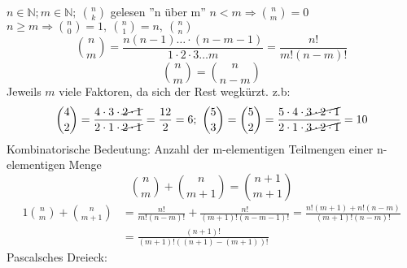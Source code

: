 $n \in \mathbb{N}; m \in \mathbb{N};\ \binom{n}{k}$  gelesen ''n über m'' $n < m \Rightarrow \binom{n}{m} = 0$ $n \geq m \Rightarrow \binom{n}{0} = 1,\ \binom{n}{1} = n,\ \binom{n}{n}$
$$\binom{n}{m} = \frac{n(n-1) \dots \cdot (n-m-1)}{1\cdot 2\cdot3 \dots m} = \frac{n!}{m!(n-m)!}$$
$$\binom{n}{m}=\binom{n}{n-m}$$ Jeweils $m$ viele Faktoren, da sich der Rest wegkürzt.
z.b:
$$\binom{4}{2} = \frac{4 \cdot 3 \cdot \cancel{2 \cdot 1}}{2 \cdot 1 \cdot \cancel{2 \cdot 1}} = \frac{12}{2} = 6;\ \binom{5}{3} = \binom{5}{2} = \frac{5 \cdot 4 \cdot  \cancel{3 \cdot 2 \cdot 1}}{2 \cdot 1 \cdot \cancel{3 \cdot 2 \cdot 1}} = 10$$
Kombinatorische Bedeutung: Anzahl der m-elementigen Teilmengen einer n-elementigen Menge
$$\binom{n}{m}+\binom{n}{m+1}=\binom{n+1}{m+1}$$
\begin{alignat*}{1}
    \binom{n}{m}+\binom{n}{m+1} & =\frac{n!}{m!(n-m)!}+\frac{n!}{(m+1)!(n-m-1)!}=\frac{n!(m+1)+n!(n-m)}{(m+1)!(n-m)!} \\
    & =\frac{(n+1)!}{(m+1)!((n+1)-(m+1))!}
\end{alignat*}
Pascalsches Dreieck: \\
